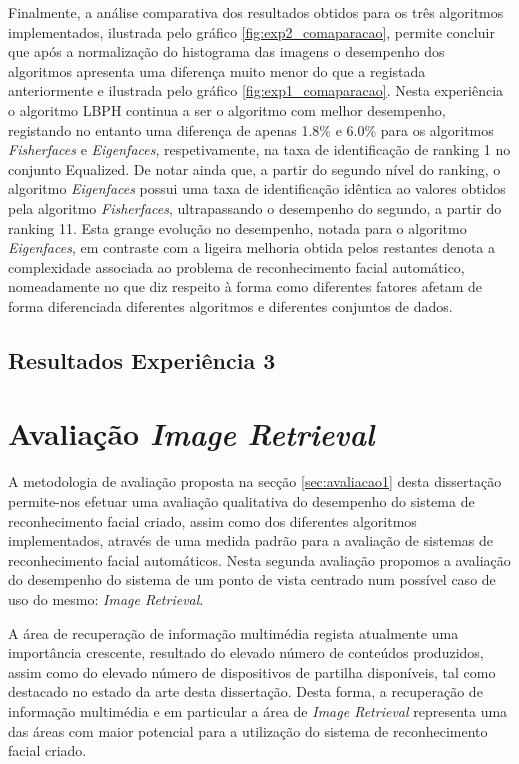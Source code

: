 Finalmente, a análise comparativa dos resultados obtidos para os três algoritmos implementados, ilustrada pelo gráfico \ref{fig:exp2_comaparacao}, permite concluir que após a normalização do histograma das imagens o desempenho dos algoritmos apresenta uma diferença muito menor do que a registada anteriormente e ilustrada pelo gráfico \ref{fig:exp1_comaparacao}. Nesta experiência o algoritmo LBPH continua a ser o algoritmo com melhor desempenho, registando no entanto uma diferença de apenas 1.8\% e 6.0\% para os algoritmos \textit{Fisherfaces} e \textit{Eigenfaces}, respetivamente, na taxa de identificação de ranking 1 no conjunto Equalized. De notar ainda que, a partir do segundo nível do ranking, o algoritmo  \textit{Eigenfaces} possui uma taxa de identificação idêntica ao valores obtidos pela algoritmo \textit{Fisherfaces}, ultrapassando o desempenho do segundo, a partir do ranking 11. Esta grange evolução no desempenho, notada para o algoritmo \textit{Eigenfaces}, em contraste com a ligeira melhoria obtida pelos restantes denota a complexidade associada ao problema de reconhecimento facial automático, nomeadamente no que diz respeito à forma como diferentes fatores afetam de forma diferenciada diferentes algoritmos e diferentes conjuntos de dados.

\subsection{Resultados Experiência 3}

\section{Avaliação \textit{Image Retrieval}} \label{sec:avaliacao2}
A metodologia de avaliação proposta na secção \ref{sec:avaliacao1} desta dissertação permite-nos efetuar uma avaliação qualitativa do desempenho do sistema de reconhecimento facial criado, assim como dos diferentes algoritmos implementados, através de uma medida padrão para a avaliação de sistemas de reconhecimento facial automáticos. Nesta segunda avaliação propomos a avaliação do desempenho do sistema de um ponto de vista centrado num possível caso de uso do mesmo: \textit{Image Retrieval}.

A área de recuperação de informação multimédia regista atualmente uma importância crescente, resultado do elevado número de conteúdos produzidos, assim como do elevado número de dispositivos de partilha disponíveis, tal como destacado no estado da arte desta dissertação. Desta forma, a recuperação de informação multimédia e em particular a área de \textit{Image Retrieval} representa uma das áreas com maior potencial para a utilização do sistema de reconhecimento facial criado.

